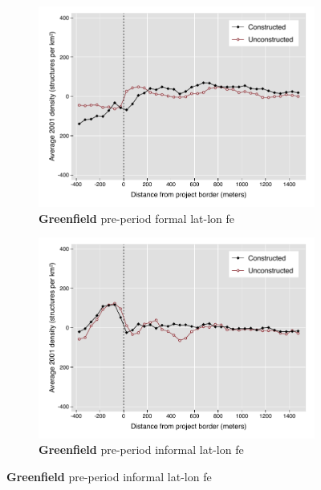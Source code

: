 \documentclass[12pt]{article}
\begin{document}
\begin{figure}
\begin{subfigure}[b]{0.48\textwidth}
        \end{subfigure}
        \begin{subfigure}[b]{0.48\textwidth}
                    \caption[Network2]%
            {{\footnotesize \textbf{Greenfield} pre-period formal lat-lon fe }}    
            \label{fig:prefor}
            \centering
            \includegraphics[width=\textwidth,trim={0.3cm .3cm 0.1cm 0cm}, clip=true]{figures/bblu_for_fe_pre_means_4_1_30k.pdf}

        \end{subfigure}
        \hfill
        \begin{subfigure}[b]{0.48\textwidth}  
                    \caption[]%
            {{\footnotesize \textbf{Greenfield} pre-period informal lat-lon fe }}     
            \label{fig:preinf}
            \centering 
            \includegraphics[width=\textwidth,trim={0.3cm .3cm 0.1cm 0cm}, clip=true]{figures/bblu_inf_fe_pre_means_4_1_30k.pdf}


\end{subfigure}
\end{figure}
\end{document}
